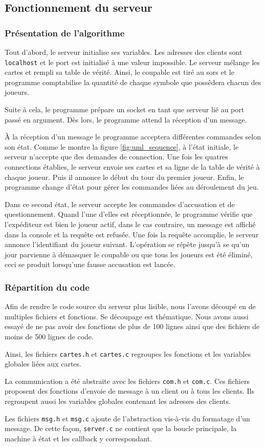 \subsection{Fonctionnement du serveur}

\subsubsection{Présentation de l'algorithme}

Tout d'abord, le serveur initialise ses variables. Les adresses des clients sont
\verb|localhost| et le port est initialisé à une valeur impossible. Le serveur
mélange les cartes et rempli sa table de vérité. Ainsi, le coupable est tiré au
sors et le programme comptabilise la quantité de chaque symbole que possêdera
chacun des joueurs.

Suite à cela, le programme prépare un socket en tant que serveur lié au port
passé en argument. Dès lors, le programme attend la réception d'un message.

À la réception d'un message le programme acceptera différentes commandes selon
son état. Comme le montre la figure \ref{fig:uml_sequence}, à l'état initiale,
le serveur n'accepte que des demandes de connection. Une fois les quatres
connections établies, le serveur envoie ses cartes et sa ligne de la table de
vérité à chaque joueur. Puis il annonce le début du tour du premier joueur.
Enfin, le programme change d'état pour gérer les commandes liées au déroulement
du jeu.

Dans ce second état, le serveur accepte les commandes d'accusation et de
questionnement. Quand l'une d'elles est réceptionnée, le programme vérifie que
l'expéditeur est bien le joueur actif, dans le cas contraire, un message est
affiché dans la console et la requête est refusée. Une fois la requête
accomplie, le serveur annonce l'identifiant du joueur suivant. L'opération se
répète jusqu'à se qu'un jour parvienne à démasquer le coupable ou que tous les
joueurs est été éliminé, ceci se produit lorsqu'une fausse accusation est
lancée.

\subsubsection{Répartition du code}

Afin de rendre le code source du serveur plus lisible, nous l'avons découpé en
de multiples fichiers et fonctions. Se découpage est thématique. Nous avons
aussi essayé de ne pas avoir des fonctions de plus de 100 lignes ainsi que des
fichiers de moins de 500 lignes de code.

Ainsi, les fichiers \verb=cartes.h= et \verb=cartes.c= regroupes les fonctions
et les variables globales liées aux cartes.

La communication a été abstraite avec les fichiers \verb=com.h= et \verb=com.c=.
Ces fichiers proposent des fonctions d'envoie de message à un client ou à tous
les clients. Ils regroupent aussi les variables globales contenant les adresses
des clients.

Les fichiers \verb=msg.h= et \verb=msg.c= ajoute de l'abstraction vis-à-vis du
formatage d'un message. De cette façon, \verb=server.c= ne contient que la
boucle principale, la machine à état et les callback y correspondant.
